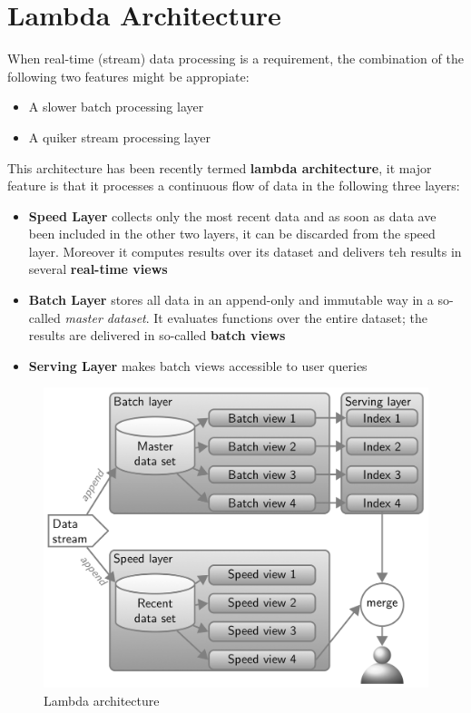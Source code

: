 \section{Lambda Architecture}
When real-time (stream) data processing is a requirement, the combination of the following two features might be appropiate:
\begin{itemize}
    \item A slower batch processing layer
    \item A quiker stream processing layer
\end{itemize}
This architecture has been recently termed \textbf{lambda architecture}, it major feature is that it processes a continuous flow of data in the following three layers:
\begin{itemize}
    \item \textbf{Speed Layer} collects only the most recent data and as soon as data ave been included in the other two layers, it can be discarded from the speed layer. Moreover it computes results over its dataset and delivers teh results in several \textbf{real-time views}
    \item \textbf{Batch Layer} stores all data in an append-only and immutable way in a so-called \textit{master dataset}. It evaluates functions over the entire dataset; the results are delivered in so-called \textbf{batch views}
    \item \textbf{Serving Layer} makes batch views accessible to user queries
\end{itemize}
\begin{figure}[!h]
        \centering
        \includegraphics[width=0.7\linewidth]{images/AdvancedDataManagment/polyglot_database_architectures/lambda_arc.jpeg}
        \caption{Lambda architecture}
    \end{figure}


